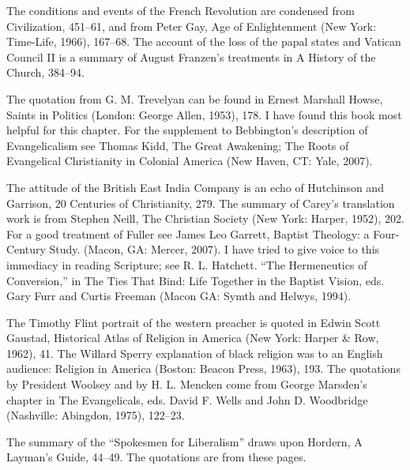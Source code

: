 \begin{notelist}
\entry The conditions and events of the French Revolution are condensed from Civilization, 451–61,
  and from Peter Gay, Age of Enlightenment (New York: Time-Life, 1966), 167–68.
\entry The account of the loss of the papal states and Vatican Council II is a summary of August
  Franzen’s treatments in A History of the Church, 384–94.
\end{notelist}

\begin{notelist}
\entry The quotation from G. M. Trevelyan can be found in Ernest Marshall Howse, Saints in Politics
  (London: George Allen, 1953), 178. I have found this book most helpful for this chapter.
\entry For the supplement to Bebbington’s description of Evangelicalism see Thomas Kidd, The Great
  Awakening; The Roots of Evangelical Christianity in Colonial America (New Haven, CT: Yale, 2007).
\end{notelist}

\begin{notelist}
\entry The attitude of the British East India Company is an echo of Hutchinson and Garrison, 20
  Centuries of Christianity, 279.
\entry The summary of Carey’s translation work is from Stephen Neill, The Christian Society (New
  York: Harper, 1952), 202.
\entry For a good treatment of Fuller see James Leo Garrett, Baptist Theology: a Four-Century Study.
  (Macon, GA: Mercer, 2007).
\entry I have tried to give voice to this immediacy in reading Scripture; see R. L. Hatchett. “The
  Hermeneutics of Conversion,” in The Ties That Bind: Life Together in the Baptist Vision, eds. Gary
  Furr and Curtis Freeman (Macon GA: Symth and Helwys, 1994).
\end{notelist}

\begin{notelist}
\entry The Timothy Flint portrait of the western preacher is quoted in Edwin Scott Gaustad,
  Historical Atlas of Religion in America (New York: Harper \& Row, 1962), 41.
\entry The Willard Sperry explanation of black religion was to an English audience: Religion in
  America (Boston: Beacon Press, 1963), 193.
\entry The quotations by President Woolsey and by H. L. Mencken come from George Marsden’s chapter
  in The Evangelicals, eds. David F. Wells and John D. Woodbridge (Nashville: Abingdon, 1975),
  122–23.
\end{notelist}

\begin{notelist}
\entry The summary of the “Spokesmen for Liberalism” draws upon Hordern, A Layman’s Guide, 44–49.
  The quotations are from these pages.
\end{notelist}


